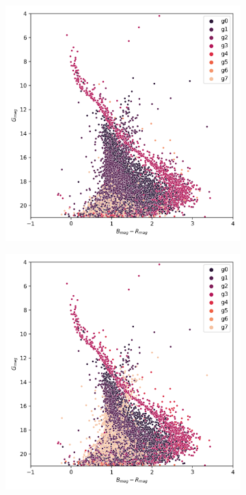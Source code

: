 \documentclass[preprint,12pt,authoryear]{elsarticle}
\begin{document}
\begin{figure}[!hbt]
  \begin{subfigure}{0.29\textwidth}
    \includegraphics[width=\textwidth]{../figures/ngc_2516/kmeans_hr_diagram_ngc_2516.png}
  \end{subfigure}
  \begin{subfigure}{0.29\textwidth}
    \includegraphics[width=\textwidth]{../figures/ngc_2516/dec_hr_diagram_ngc_2516.png}

\end{subfigure}
\end{figure}
\end{document}
